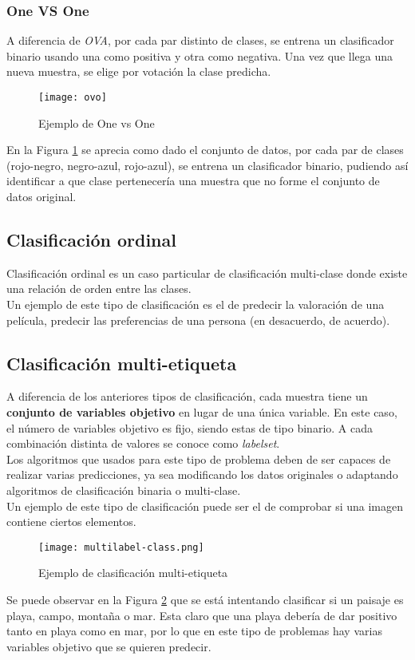 \subsubsection*{One VS One}
A diferencia de \textit{OVA}, por cada par distinto de clases, se entrena un clasificador binario usando una como positiva y otra como negativa. Una vez que llega una nueva muestra, se elige por votación la clase predicha.
\begin{figure}[H]
	\centering
	\texttt{[image: ovo]}
	\caption{Ejemplo de One vs One}
	\label{fig:ovo}
\end{figure}
En la Figura \ref{fig:ovo} se aprecia como dado el conjunto de datos, por cada par de clases (rojo-negro, negro-azul, rojo-azul), se entrena un clasificador binario, pudiendo así identificar a que clase pertenecería una muestra que no forme el conjunto de datos original.
\subsection{Clasificación ordinal}
Clasificación ordinal es un caso particular de clasificación multi-clase donde existe una relación de orden entre las clases.\\
Un ejemplo de este tipo de clasificación es el de predecir la valoración de una película, predecir las preferencias de una persona (en desacuerdo, de acuerdo).
\subsection{Clasificación multi-etiqueta}
\label{sec:ml}
A diferencia de los anteriores tipos de clasificación, cada muestra tiene un \textbf{conjunto de variables objetivo} en lugar de una única variable. En este caso, el número de variables objetivo es fijo, siendo estas de tipo binario. A cada combinación distinta de valores se conoce como \textit{labelset}.\\
Los algoritmos que usados para este tipo de problema deben de ser capaces de realizar varias predicciones, ya sea modificando los datos originales o adaptando algoritmos de clasificación binaria o multi-clase.\\
\linebreak
Un ejemplo de este tipo de clasificación puede ser el de comprobar si una imagen contiene ciertos elementos.
\begin{figure}[H]
	\centering
	\texttt{[image: multilabel-class.png]}
	\caption{Ejemplo de clasificación multi-etiqueta}
	\label{fig:mlclasss}
\end{figure}
Se puede observar en la Figura \ref{fig:mlclasss} que se está intentando clasificar si un paisaje es playa, campo, montaña o mar. Esta claro que una playa debería de dar positivo tanto en playa como en mar, por lo que en este tipo de problemas hay varias variables objetivo que se quieren predecir.\\
\linebreak
